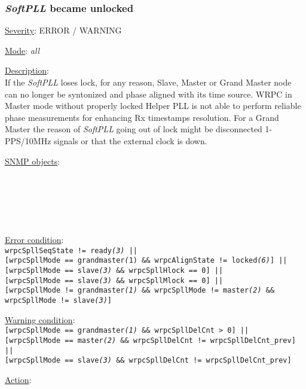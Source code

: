 \subsubsection{\bf \emph{SoftPLL} became unlocked}
		\label{fail:timing:spll_unlock}
		\begin{pck_descr}
			\item [] \underline{Severity}: ERROR / WARNING
			\item [] \underline{Mode}: \emph{all}
			\item [] \underline{Description}:\\
				If the \emph{SoftPLL} loses lock, for any reason, Slave, Master or Grand
				Master node can no longer be syntonized and phase aligned with its time
				source. WRPC in Master mode without properly locked Helper PLL is not
				able to perform reliable phase measurements for enhancing Rx timestamps
				resolution. For a Grand Master the reason of \emph{SoftPLL} going out of
				lock might be disconnected 1-PPS/10MHz signals or that the external
				clock is down.
			\item [] \underline{SNMP objects}:\\
				{\footnotesize
				\\
				\\
				\\
				\\
				\\
				 }
			\item [] \underline{Error condition}:\\
				{\footnotesize
        \texttt{wrpcSpllSeqState != ready\emph{(3)} ||}\\
        \texttt{[wrpcSpllMode == grandmaster\emph(1) \&\& wrpcAlignState != locked\emph{(6)}] ||}\\ %
        \texttt{[wrpcSpllMode == slave\emph{(3)} \&\& wrpcSpllHlock == 0] ||}\\ %
				\texttt{[wrpcSpllMode == slave\emph{(3)} \&\& wrpcSpllMlock == 0] ||}\\ %
        \texttt{[wrpcSpllMode != grandmaster\emph{(1)} \&\& wrpcSpllMode != master\emph{(2)} \&\& wrpcSpllMode != slave\emph{(3)}]}} %
			\item [] \underline{Warning condition}:\\
				{\footnotesize
        \texttt{[wrpcSpllMode == grandmaster\emph{(1)} \&\& wrpcSpllDelCnt > 0] ||}\\ %
        \texttt{[wrpcSpllMode == master\emph{(2)} \&\& wrpcSpllDelCnt != wrpcSpllDelCnt\_prev] ||}\\ %
        \texttt{[wrpcSpllMode == slave\emph{(3)} \&\& wrpcSpllDelCnt != wrpcSpllDelCnt\_prev]} } %
      \item [] \underline{Action}:\\
		\end{pck_descr}

